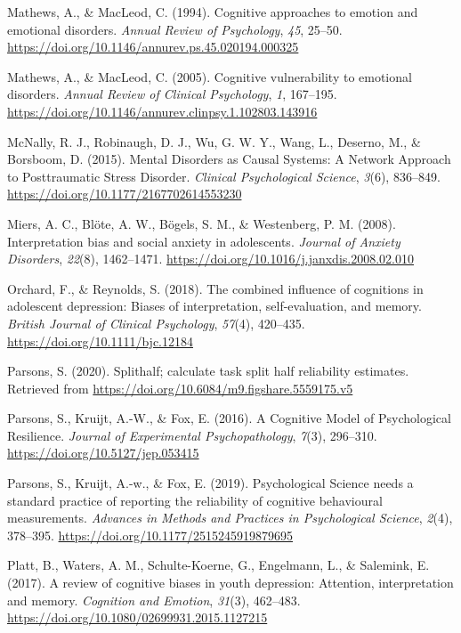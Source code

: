 \documentclass[
  english,
  man,floatsintext]{apa6}
\begin{document}
\leavevmode\hypertarget{ref-Mathews1994}{}%
Mathews, A., \& MacLeod, C. (1994). Cognitive approaches to emotion and emotional disorders. \emph{Annual Review of Psychology}, \emph{45}, 25--50. \url{https://doi.org/10.1146/annurev.ps.45.020194.000325}

\leavevmode\hypertarget{ref-Mathews2005}{}%
Mathews, A., \& MacLeod, C. (2005). Cognitive vulnerability to emotional disorders. \emph{Annual Review of Clinical Psychology}, \emph{1}, 167--195. \url{https://doi.org/10.1146/annurev.clinpsy.1.102803.143916}

\leavevmode\hypertarget{ref-McNally2011}{}%
McNally, R. J., Robinaugh, D. J., Wu, G. W. Y., Wang, L., Deserno, M., \& Borsboom, D. (2015). Mental Disorders as Causal Systems: A Network Approach to Posttraumatic Stress Disorder. \emph{Clinical Psychological Science}, \emph{3}(6), 836--849. \url{https://doi.org/10.1177/2167702614553230}

\leavevmode\hypertarget{ref-miers_interpretation_2008}{}%
Miers, A. C., Blöte, A. W., Bögels, S. M., \& Westenberg, P. M. (2008). Interpretation bias and social anxiety in adolescents. \emph{Journal of Anxiety Disorders}, \emph{22}(8), 1462--1471. \url{https://doi.org/10.1016/j.janxdis.2008.02.010}

\leavevmode\hypertarget{ref-orchard_combined_2018}{}%
Orchard, F., \& Reynolds, S. (2018). The combined influence of cognitions in adolescent depression: Biases of interpretation, self-evaluation, and memory. \emph{British Journal of Clinical Psychology}, \emph{57}(4), 420--435. \url{https://doi.org/10.1111/bjc.12184}

\leavevmode\hypertarget{ref-R-splithalf}{}%
Parsons, S. (2020). Splithalf; calculate task split half reliability estimates. Retrieved from \url{https://doi.org/10.6084/m9.figshare.5559175.v5}

\leavevmode\hypertarget{ref-Parsons2016}{}%
Parsons, S., Kruijt, A.-W., \& Fox, E. (2016). A Cognitive Model of Psychological Resilience. \emph{Journal of Experimental Psychopathology}, \emph{7}(3), 296--310. \url{https://doi.org/10.5127/jep.053415}

\leavevmode\hypertarget{ref-Parsons2019}{}%
Parsons, S., Kruijt, A.-w., \& Fox, E. (2019). Psychological Science needs a standard practice of reporting the reliability of cognitive behavioural measurements. \emph{Advances in Methods and Practices in Psychological Science}, \emph{2}(4), 378--395. \url{https://doi.org/10.1177/2515245919879695}

\leavevmode\hypertarget{ref-platt_review_2017}{}%
Platt, B., Waters, A. M., Schulte-Koerne, G., Engelmann, L., \& Salemink, E. (2017). A review of cognitive biases in youth depression: Attention, interpretation and memory. \emph{Cognition and Emotion}, \emph{31}(3), 462--483. \url{https://doi.org/10.1080/02699931.2015.1127215}
\end{document}

